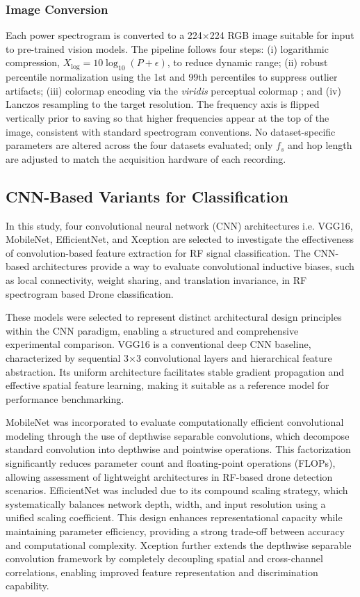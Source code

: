 \documentclass[runningheads]{llncs}
\begin{document}
\subsubsection{Image Conversion}
Each power spectrogram is converted to a 224$\times$224 RGB image suitable for input to pre-trained vision models. The pipeline follows four steps: (i) logarithmic compression, $X_{\log} = 10\log_{10}(P + \epsilon)$, to reduce dynamic range; (ii) robust percentile normalization using the 1st and 99th percentiles to suppress outlier artifacts; (iii) colormap encoding via the \textit{viridis} perceptual colormap \cite{ref36}; and (iv) Lanczos resampling to the target resolution. The frequency axis is flipped vertically prior to saving so that higher frequencies appear at the top of the image, consistent with standard spectrogram conventions. No dataset-specific parameters are altered across the four datasets evaluated; only $f_s$ and hop length are adjusted to match the acquisition hardware of each recording.
\subsection{CNN-Based Variants for Classification}

In this study, four convolutional neural network (CNN) architectures i.e. VGG16, MobileNet, EfficientNet, and Xception are selected to investigate the effectiveness of convolution-based feature extraction for RF signal classification. 
The CNN-based architectures provide a way to evaluate convolutional inductive biases, such as local connectivity, weight sharing, and translation invariance, in RF spectrogram based Drone classification.

These models were selected to represent distinct architectural design principles within the CNN paradigm, enabling a structured and comprehensive experimental comparison. VGG16 is a conventional deep CNN baseline, characterized by sequential 3×3 convolutional layers and hierarchical feature abstraction. Its uniform architecture facilitates stable gradient propagation and effective spatial feature learning, making it suitable as a reference model for performance benchmarking.

MobileNet was incorporated to evaluate computationally efficient convolutional modeling through the use of depthwise separable convolutions, which decompose standard convolution into depthwise and pointwise operations. This factorization significantly reduces parameter count and floating-point operations (FLOPs), allowing assessment of lightweight architectures in RF-based drone detection scenarios. EfficientNet was included due to its compound scaling strategy, which systematically balances network depth, width, and input resolution using a unified scaling coefficient. This design enhances representational capacity while maintaining parameter efficiency, providing a strong trade-off between accuracy and computational complexity. Xception further extends the depthwise separable convolution framework by completely decoupling spatial and cross-channel correlations, enabling improved feature representation and discrimination capability.
\end{document}
